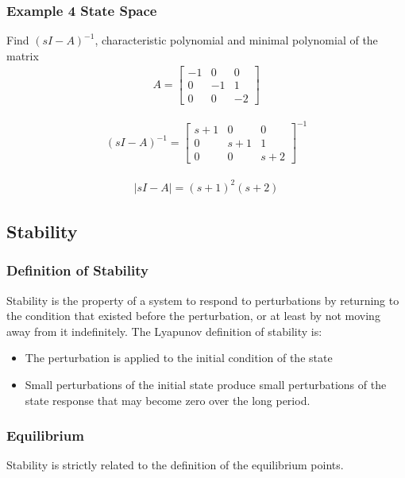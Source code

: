 \documentclass[11pt]{article}
\begin{document}
\subsubsection{Example 4 State Space}
Find $(s I - A)^{-1}$, characteristic polynomial and minimal polynomial of the matrix
\begin{align}
  A =
  \begin{bmatrix}
     -1 & 0 & 0 \\ 
     0 & -1 & 1 \\
     0 & 0 & -2
  \end{bmatrix}
\end{align}

\begin{align}
  (s I - A)^{-1} =
  \begin{bmatrix}
    s +1 & 0 & 0 \\
    0 & s + 1 & 1 \\ 
    0 & 0 & s + 2
  \end{bmatrix}^{-1}
\end{align}

\begin{align}
  |s I - A| = 
    (s+1)^2(s+2)
\end{align}

\subsection{Stability}
\subsubsection{Definition of Stability}
Stability is the property of a system to respond to perturbations by returning to the condition that existed before the perturbation, or at least by not moving away from it indefinitely.
The Lyapunov definition of stability is:
\begin{itemize}
  \item The perturbation is applied to the initial condition of the state
  \item Small perturbations of the initial state produce small perturbations of the state response that may become zero over the long period.
\end{itemize}
\subsubsection{Equilibrium}
Stability is strictly related to the definition of the equilibrium points.
\end{document}

